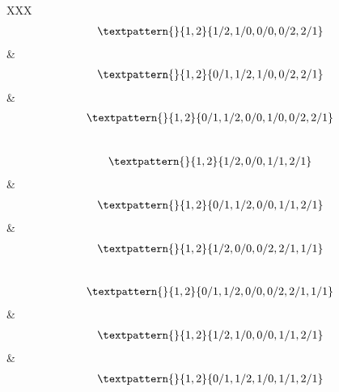 \begin{center}
\begin{longtabu}[l]{XXX}
\begin{equation}
\begin{gathered}
		\textpattern{}{1,2}{1/2,1/0,0/0,0/2,2/1}
	\end{gathered}
	\label{cls:52}
\end{equation}
    &
\begin{equation}
	\begin{gathered}
		\textpattern{}{1,2}{0/1,1/2,1/0,0/2,2/1}
	\end{gathered}
	\label{cls:53}
\end{equation}
    &
\begin{equation}
	\begin{gathered}
		\textpattern{}{1,2}{0/1,1/2,0/0,1/0,0/2,2/1}
	\end{gathered}
	\label{cls:54}
\end{equation}
\\
\begin{equation}
	\begin{gathered}
		\textpattern{}{1,2}{1/2,0/0,1/1,2/1}
	\end{gathered}
	\label{cls:55}
\end{equation}
    &
\begin{equation}
	\begin{gathered}
		\textpattern{}{1,2}{0/1,1/2,0/0,1/1,2/1}
	\end{gathered}
	\label{cls:56}
\end{equation}
    &
\begin{equation}
	\begin{gathered}
		\textpattern{}{1,2}{1/2,0/0,0/2,2/1,1/1}
	\end{gathered}
	\label{cls:57}
\end{equation}
\\
\begin{equation}
	\begin{gathered}
		\textpattern{}{1,2}{0/1,1/2,0/0,0/2,2/1,1/1}
	\end{gathered}
	\label{cls:58}
\end{equation}
&
\begin{equation}
	\begin{gathered}
		\textpattern{}{1,2}{1/2,1/0,0/0,1/1,2/1}
	\end{gathered}
	\label{cls:59}
\end{equation}
&
\begin{equation}
	\begin{gathered}
		\textpattern{}{1,2}{0/1,1/2,1/0,1/1,2/1}
	\end{gathered}
	\label{cls:60}
\end{equation}
\\

\end{longtabu}
\end{center}
